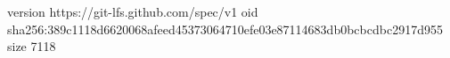 version https://git-lfs.github.com/spec/v1
oid sha256:389c1118d6620068afeed45373064710efe03e87114683db0bcbcdbc2917d955
size 7118
